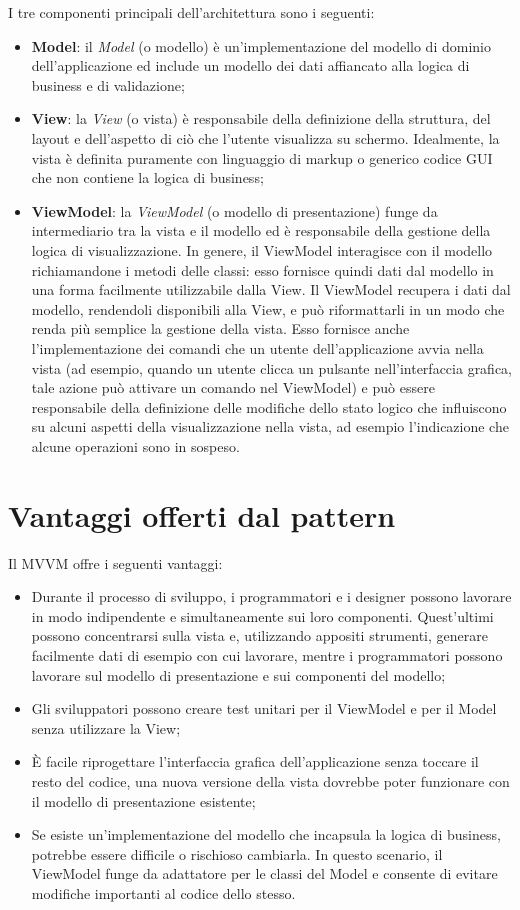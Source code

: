 \documentclass[openany,12pt,a4paper]{report}
\begin{document}
	\noindent I tre componenti principali dell'architettura sono i seguenti:
	\begin{itemize}
		\item \textbf{Model}: il \textit{Model} (o modello) è un'implementazione del modello di dominio dell'applicazione ed include un modello dei dati affiancato alla logica di business e di validazione;
		\item \textbf{View}: la \textit{View} (o vista) è responsabile della definizione della struttura, del layout e dell'aspetto di ciò che l'utente visualizza su schermo. Idealmente, la vista è definita puramente con linguaggio di markup o generico codice GUI che non contiene la logica di business;
		\item \textbf{ViewModel}: la \textit{ViewModel} (o modello di presentazione) funge da intermediario tra la vista e il modello ed è responsabile della gestione della logica di visualizzazione. In genere, il ViewModel interagisce con il modello richiamandone i metodi delle classi: esso fornisce quindi dati dal modello in una forma facilmente utilizzabile dalla View. Il ViewModel recupera i dati dal modello, rendendoli disponibili alla View, e può riformattarli in un modo che renda più semplice la gestione della vista. Esso fornisce anche l'implementazione dei comandi che un utente dell'applicazione avvia nella vista (ad esempio, quando un utente clicca un pulsante nell'interfaccia grafica, tale azione può attivare un comando nel ViewModel) e può essere responsabile della definizione delle modifiche dello stato logico che influiscono su alcuni aspetti della visualizzazione nella vista, ad esempio l'indicazione che alcune operazioni sono in sospeso.
	\end{itemize}
	
	\section{Vantaggi offerti dal pattern}
	Il MVVM offre i seguenti vantaggi:
	
	\begin{itemize}
		\item Durante il processo di sviluppo, i programmatori e i designer possono lavorare in modo indipendente e simultaneamente sui loro componenti. Quest'ultimi possono concentrarsi sulla vista e, utilizzando appositi strumenti, generare facilmente dati di esempio con cui lavorare, mentre i programmatori possono lavorare sul modello di presentazione e sui componenti del modello;
		\item Gli sviluppatori possono creare test unitari per il ViewModel e per il Model senza utilizzare la View;
		\item È facile riprogettare l'interfaccia grafica dell'applicazione senza toccare il resto del codice, una nuova versione della vista dovrebbe poter funzionare con il modello di presentazione esistente;
		\item Se esiste un'implementazione del modello che incapsula la logica di business, potrebbe essere difficile o rischioso cambiarla. In questo scenario, il ViewModel funge da adattatore per le classi del Model e consente di evitare modifiche importanti al codice dello stesso.	
	\end{itemize}
\end{document}
